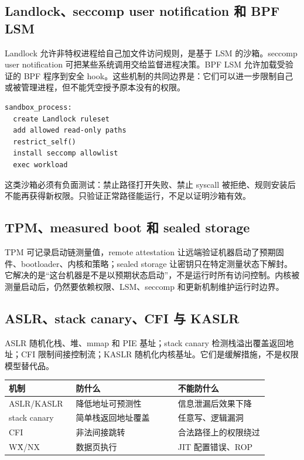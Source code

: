 \subsection{Landlock、seccomp user notification 和 BPF LSM}

Landlock 允许非特权进程给自己加文件访问规则，是基于 LSM 的沙箱。seccomp user notification 可把某些系统调用交给监督进程决策。BPF LSM 允许加载受验证的 BPF 程序到安全 hook。这些机制的共同边界是：它们可以进一步限制自己或被管理进程，但不能凭空授予原本没有的权限。

\begin{lstlisting}
sandbox_process:
  create Landlock ruleset
  add allowed read-only paths
  restrict_self()
  install seccomp allowlist
  exec workload
\end{lstlisting}

这类沙箱必须有负面测试：禁止路径打开失败、禁止 syscall 被拒绝、规则安装后不能再获得新权限。只验证正常路径能运行，不足以证明沙箱有效。

\subsection{TPM、measured boot 和 sealed storage}

TPM 可记录启动链测量值，remote attestation 让远端验证机器启动了预期固件、bootloader、内核和策略；sealed storage 让密钥只在特定测量状态下解封。它解决的是“这台机器是不是以预期状态启动”，不是运行时所有访问控制。内核被测量启动后，仍然要依赖权限、LSM、seccomp 和更新机制维护运行时边界。

\subsection{ASLR、stack canary、CFI 与 KASLR}

ASLR 随机化栈、堆、mmap 和 PIE 基址；stack canary 检测栈溢出覆盖返回地址；CFI 限制间接控制流；KASLR 随机化内核基址。它们是缓解措施，不是权限模型替代品。

\begin{longtable}{p{0.2\linewidth}p{0.36\linewidth}p{0.32\linewidth}}
\toprule
机制 & 防什么 & 不能防什么 \\
\midrule
ASLR/KASLR & 降低地址可预测性 & 信息泄漏后效果下降 \\
stack canary & 简单栈返回地址覆盖 & 任意写、逻辑漏洞 \\
CFI & 非法间接跳转 & 合法路径上的权限绕过 \\
W\^X/NX & 数据页执行 & JIT 配置错误、ROP \\
\bottomrule
\end{longtable}


